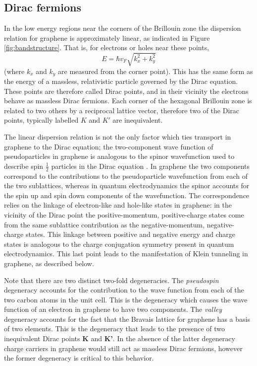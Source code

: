 \documentclass[edeposit,fullpage,draftthesis]{uiucthesis2009}
\begin{document}
    
    \subsection{Dirac fermions}
    	
        In the low energy regions near the corners of the Brillouin zone the dispersion relation for graphene is approximately linear, as indicated in Figure \ref{fig:bandstructure}. That is, for electrons or holes near these points,
        \begin{equation}
        E = \hbar v_F \sqrt{k_x^2 + k_y^2}
        \end{equation}
        (where $k_x$ and $k_y$ are measured from the corner point). This has the same form as the energy of a massless, relativistic particle governed by the Dirac equation. These points are therefore called Dirac points, and in their vicinity the electrons behave as massless Dirac fermions. Each corner of the hexagonal Brillouin zone is related to two others by a reciprocal lattice vector, therefore two of the Dirac points, typically labelled $K$ and $K'$ are inequivalent.
    
        The linear dispersion relation is not the only factor which ties transport in graphene to the Dirac equation; the two-component wave function of pseudoparticles in graphene is analogous to the spinor wavefunction used to describe spin $\frac{1}{2}$ particles in the Dirac equation \cite{Katsnelson2006}. In graphene the two components correspond to the contributions to the pseudoparticle wavefunction from each of the two sublattices, whereas in quantum electrodynamics the spinor accounts for the spin up and spin down components of the wavefunction.
        The correspondence relies on the linkage of electron-like and hole-like states in graphene:
        in the vicinity of the Dirac point the positive-momentum, positive-charge states come from
        the same sublattice contribution as the negative-momentum, negative-charge states. 
        This linkage between positive and negative energy and charge states is analogous
        to the charge conjugation symmetry present in quantum electrodynamics.
        This last point leads to the manifestation of Klein tunneling in graphene, as described below.
    
        Note that there are two distinct two-fold degeneracies. The \textit{pseudospin} degeneracy
        accounts for the contribution to the wave function from each of the two carbon atoms in
        the unit cell. This is the degeneracy which causes the wave function of an electron in graphene
        to have two components.
        The \textit{valley} degeneracy accounts for the fact that the Bravais lattice for graphene
        has a basis of two elements. This is the degeneracy that leads to the presence
        of two inequivalent Dirac points \textbf{K} and \textbf{K'}. In the absence of the latter
        degeneracy charge carriers in graphene would still act as massless Dirac fermions, however
        the former degeneracy is critical to this behavior.
        
\end{document}
